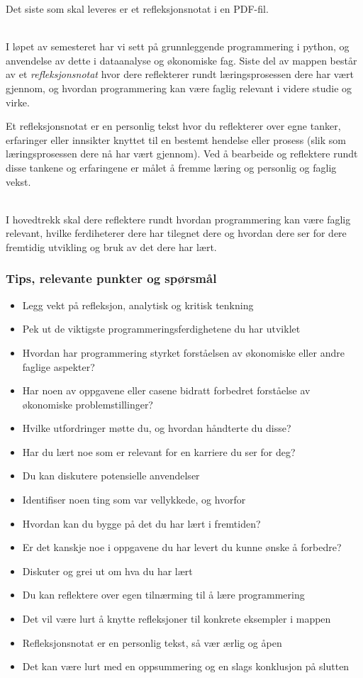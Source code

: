 \documentclass[12pt, titlepage]{article}
\begin{document}
Det siste som skal leveres er et refleksjonsnotat i en PDF-fil.

~\\
I løpet av semesteret har vi sett på grunnleggende programmering i python, og anvendelse av dette i dataanalyse og økonomiske fag.
Siste del av mappen består av et \textit{refleksjonsnotat} hvor dere reflekterer rundt læringsprosessen dere har vært gjennom, og hvordan programmering kan være faglig relevant i videre studie og virke.

Et refleksjonsnotat er en personlig tekst hvor du reflekterer over egne tanker, erfaringer eller innsikter knyttet til en bestemt hendelse eller prosess (slik som læringsprosessen dere nå har vært gjennom).
Ved å bearbeide og reflektere rundt disse tankene og erfaringene er målet å fremme læring og personlig og faglig vekst.

~\\
I hovedtrekk skal dere reflektere rundt hvordan programmering kan være faglig relevant, hvilke ferdiheterer dere har tilegnet dere og hvordan dere ser for dere fremtidig utvikling og bruk av det dere har lært.\\
\subsubsection*{Tips, relevante punkter og spørsmål}
\begin{itemize}
   \item{Legg vekt på refleksjon, analytisk og kritisk tenkning}
   \item{Pek ut de viktigste programmeringsferdighetene du har utviklet}
   \item{Hvordan har programmering styrket forståelsen av økonomiske eller andre faglige aspekter?}
   \item{Har noen av oppgavene eller casene bidratt forbedret forståelse av økonomiske problemstillinger?}
   \item{Hvilke utfordringer møtte du, og hvordan håndterte du disse?}
   \item{Har du lært noe som er relevant for en karriere du ser for deg?}
   \item{Du kan diskutere potensielle anvendelser}
   \item{Identifiser noen ting som var vellykkede, og hvorfor}
   \item{Hvordan kan du bygge på det du har lært i fremtiden?}
   \item{Er det kanskje noe i oppgavene du har levert du kunne ønske å forbedre?}
   \item{Diskuter og grei ut om hva du har lært}
   \item{Du kan reflektere over egen tilnærming til å lære programmering}
   \item{Det vil være lurt å knytte refleksjoner til konkrete eksempler i mappen}
   \item{Refleksjonsnotat er en personlig tekst, så vær ærlig og åpen}
   \item{Det kan være lurt med en oppsummering og en slags konklusjon på slutten}
\end{itemize}
\end{document}
